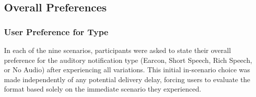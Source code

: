 \begin{table}[H]
\centering
\caption{Summary of descriptive mean scores ($M$) for each notification type, isolated by the contextual factors relevant to our primary hypotheses. All ratings are based on 7-point Likert scales (1 = lowest/worst, 7 = highest/best).}
\label{tab:descriptive_summary}
\end{table}





\subsection{Overall Preferences}

\subsubsection{User Preference for Type}
\label{sec:user_preference_type}

In each of the nine scenarios, participants were asked to state their overall preference for the auditory notification type (Earcon, Short Speech, Rich Speech, or No Audio) after experiencing all variations. This initial in-scenario choice was made independently of any potential delivery delay, forcing users to evaluate the format based solely on the immediate scenario they experienced. 

